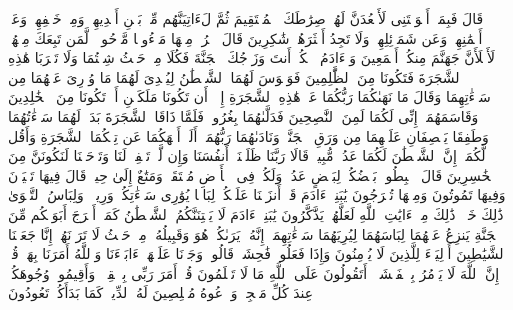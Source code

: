 قَالَ فَبِمَاۤ أَغۡوَیۡتَنِی لَأَقۡعُدَنَّ لَهُمۡ صِرَٰطَكَ ٱلۡمُسۡتَقِیمَ%
\stopbuffer
\startbuffer[\q:7:17]
ثُمَّ لَءَاتِیَنَّهُم مِّنۢ بَیۡنِ أَیۡدِیهِمۡ وَمِنۡ خَلۡفِهِمۡ وَعَنۡ أَیۡمَٰنِهِمۡ وَعَن شَمَاۤئِلِهِمۡۖ وَلَا تَجِدُ أَكۡثَرَهُمۡ شَٰكِرِینَ%
\stopbuffer
\startbuffer[\q:7:18]
قَالَ ٱخۡرُجۡ مِنۡهَا مَذۡءُومࣰا مَّدۡحُورࣰاۖ لَّمَن تَبِعَكَ مِنۡهُمۡ لَأَمۡلَأَنَّ جَهَنَّمَ مِنكُمۡ أَجۡمَعِینَ%
\stopbuffer
\startbuffer[\q:7:19]
وَیَٰۤءَادَمُ ٱسۡكُنۡ أَنتَ وَزَوۡجُكَ ٱلۡجَنَّةَ فَكُلَا مِنۡ حَیۡثُ شِئۡتُمَا وَلَا تَقۡرَبَا هَٰذِهِ ٱلشَّجَرَةَ فَتَكُونَا مِنَ ٱلظَّٰلِمِینَ%
\stopbuffer
\startbuffer[\q:7:20]
فَوَسۡوَسَ لَهُمَا ٱلشَّیۡطَٰنُ لِیُبۡدِیَ لَهُمَا مَا وُۥرِیَ عَنۡهُمَا مِن سَوۡءَٰتِهِمَا وَقَالَ مَا نَهَىٰكُمَا رَبُّكُمَا عَنۡ هَٰذِهِ ٱلشَّجَرَةِ إِلَّاۤ أَن تَكُونَا مَلَكَیۡنِ أَوۡ تَكُونَا مِنَ ٱلۡخَٰلِدِینَ%
\stopbuffer
\startbuffer[\q:7:21]
وَقَاسَمَهُمَاۤ إِنِّی لَكُمَا لَمِنَ ٱلنَّٰصِحِینَ%
\stopbuffer
\startbuffer[\q:7:22]
فَدَلَّىٰهُمَا بِغُرُورࣲۚ فَلَمَّا ذَاقَا ٱلشَّجَرَةَ بَدَتۡ لَهُمَا سَوۡءَٰتُهُمَا وَطَفِقَا یَخۡصِفَانِ عَلَیۡهِمَا مِن وَرَقِ ٱلۡجَنَّةِۖ وَنَادَىٰهُمَا رَبُّهُمَاۤ أَلَمۡ أَنۡهَكُمَا عَن تِلۡكُمَا ٱلشَّجَرَةِ وَأَقُل لَّكُمَاۤ إِنَّ ٱلشَّیۡطَٰنَ لَكُمَا عَدُوࣱّ مُّبِینࣱ%
\stopbuffer
\startbuffer[\q:7:23]
قَالَا رَبَّنَا ظَلَمۡنَاۤ أَنفُسَنَا وَإِن لَّمۡ تَغۡفِرۡ لَنَا وَتَرۡحَمۡنَا لَنَكُونَنَّ مِنَ ٱلۡخَٰسِرِینَ%
\stopbuffer
\startbuffer[\q:7:24]
قَالَ ٱهۡبِطُوا۟ بَعۡضُكُمۡ لِبَعۡضٍ عَدُوࣱّۖ وَلَكُمۡ فِی ٱلۡأَرۡضِ مُسۡتَقَرࣱّ وَمَتَٰعٌ إِلَىٰ حِینࣲ%
\stopbuffer
\startbuffer[\q:7:25]
قَالَ فِیهَا تَحۡیَوۡنَ وَفِیهَا تَمُوتُونَ وَمِنۡهَا تُخۡرَجُونَ%
\stopbuffer
\startbuffer[\q:7:26]
یَٰبَنِیۤ ءَادَمَ قَدۡ أَنزَلۡنَا عَلَیۡكُمۡ لِبَاسࣰا یُوَٰرِی سَوۡءَٰتِكُمۡ وَرِیشࣰاۖ وَلِبَاسُ ٱلتَّقۡوَىٰ ذَٰلِكَ خَیۡرࣱۚ ذَٰلِكَ مِنۡ ءَایَٰتِ ٱللَّهِ لَعَلَّهُمۡ یَذَّكَّرُونَ%
\stopbuffer
\startbuffer[\q:7:27]
یَٰبَنِیۤ ءَادَمَ لَا یَفۡتِنَنَّكُمُ ٱلشَّیۡطَٰنُ كَمَاۤ أَخۡرَجَ أَبَوَیۡكُم مِّنَ ٱلۡجَنَّةِ یَنزِعُ عَنۡهُمَا لِبَاسَهُمَا لِیُرِیَهُمَا سَوۡءَٰتِهِمَاۤۚ إِنَّهُۥ یَرَىٰكُمۡ هُوَ وَقَبِیلُهُۥ مِنۡ حَیۡثُ لَا تَرَوۡنَهُمۡۗ إِنَّا جَعَلۡنَا ٱلشَّیَٰطِینَ أَوۡلِیَاۤءَ لِلَّذِینَ لَا یُؤۡمِنُونَ%
\stopbuffer
\startbuffer[\q:7:28]
وَإِذَا فَعَلُوا۟ فَٰحِشَةࣰ قَالُوا۟ وَجَدۡنَا عَلَیۡهَاۤ ءَابَاۤءَنَا وَٱللَّهُ أَمَرَنَا بِهَاۗ قُلۡ إِنَّ ٱللَّهَ لَا یَأۡمُرُ بِٱلۡفَحۡشَاۤءِۖ أَتَقُولُونَ عَلَى ٱللَّهِ مَا لَا تَعۡلَمُونَ%
\stopbuffer
\startbuffer[\q:7:29]
قُلۡ أَمَرَ رَبِّی بِٱلۡقِسۡطِۖ وَأَقِیمُوا۟ وُجُوهَكُمۡ عِندَ كُلِّ مَسۡجِدࣲ وَٱدۡعُوهُ مُخۡلِصِینَ لَهُ ٱلدِّینَۚ كَمَا بَدَأَكُمۡ تَعُودُونَ%
\stopbuffer
\startbuffer[\q:7:30]
